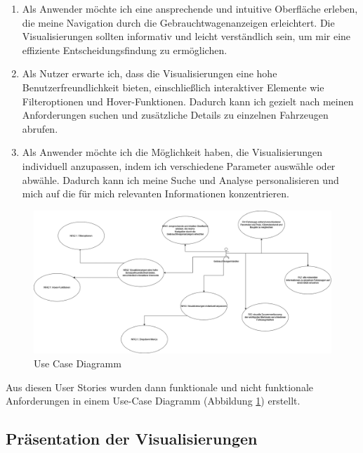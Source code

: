 \begin{enumerate}
    \item Als Anwender möchte ich eine ansprechende und intuitive Oberfläche erleben, die meine Navigation durch die Gebrauchtwagenanzeigen erleichtert. Die Visualisierungen sollten informativ und leicht verständlich sein, um mir eine effiziente Entscheidungsfindung zu ermöglichen.
    
    \item Als Nutzer erwarte ich, dass die Visualisierungen eine hohe Benutzerfreundlichkeit bieten, einschließlich interaktiver Elemente wie Filteroptionen und Hover-Funktionen. Dadurch kann ich gezielt nach meinen Anforderungen suchen und zusätzliche Details zu einzelnen Fahrzeugen abrufen.
    
    \item Als Anwender möchte ich die Möglichkeit haben, die Visualisierungen individuell anzupassen, indem ich verschiedene Parameter auswähle oder abwähle. Dadurch kann ich meine Suche und Analyse personalisieren und mich auf die für mich relevanten Informationen konzentrieren.
    
\end{enumerate}



\begin{figure}[h]
    \centering
    \includegraphics[width = \textwidth]{img/uc_diagram.png}
    \caption{Use Case Diagramm}
    \label{fig:uc_diagram}
\end{figure}

Aus diesen User Stories wurden dann funktionale und nicht funktionale Anforderungen in einem Use-Case Diagramm (Abbildung \ref*{fig:uc_diagram}) erstellt. \\
\subsection{Präsentation der Visualisierungen}
